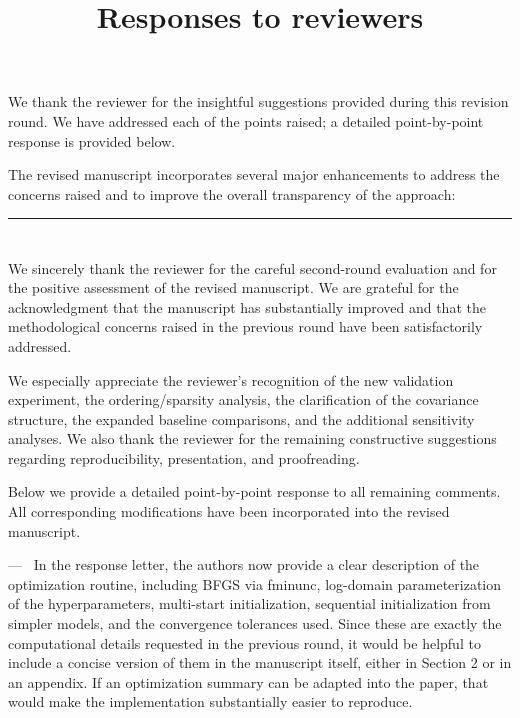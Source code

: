 \documentclass[12pt]{article}
\newcommand{\0}{\mathbf{0}}
\newcounter{reviewer}
\newcounter{point}[reviewer]
\renewcommand{\thepoint}{P\,\thereviewer.\arabic{point}}
\newcommand{\reviewersection}{\stepcounter{reviewer} \bigskip \hrule
                  \section*{}}
\newenvironment{point}
   {\refstepcounter{point} \bigskip \noindent {\textbf{Point~\thepoint} } ---\ }
   {\par }
\begin{document}
\author{ }

\date{}
\title{Responses to reviewers}
\maketitle

\vspace*{-1.0cm}

\begin{sf}
\noindent \noindent We thank the reviewer for the insightful suggestions provided during this revision round. We have addressed each of the points raised; a detailed point-by-point response is provided below. 

\noindent The revised manuscript incorporates several major enhancements to address the concerns raised and to improve the overall transparency of the approach:
\end{sf}

\reviewersection

\begin{sf}
\noindent We sincerely thank the reviewer for the careful second-round evaluation and for the positive assessment of the revised manuscript. We are grateful for the acknowledgment that the manuscript has substantially improved and that the methodological concerns raised in the previous round have been satisfactorily addressed.

\noindent We especially appreciate the reviewer’s recognition of the new validation experiment, the ordering/sparsity analysis, the clarification of the covariance structure, the expanded baseline comparisons, and the additional sensitivity analyses. We also thank the reviewer for the remaining constructive suggestions regarding reproducibility, presentation, and proofreading. 

\noindent Below we provide a detailed point-by-point response to all remaining comments. All corresponding modifications have been incorporated into the revised manuscript.
\end{sf}


\begin{point}
In the response letter, the authors now provide a clear description of the optimization routine, including BFGS via fminunc, log-domain parameterization of the hyperparameters, multi-start initialization, sequential initialization from simpler models, and the convergence tolerances used. Since these are exactly the computational details requested in the previous round, it would be helpful to include a concise version of them in the manuscript itself, either in Section 2 or in an appendix. If an optimization summary can be adapted into the paper, that would make the implementation substantially easier to reproduce.
\end{point}
\end{document}
